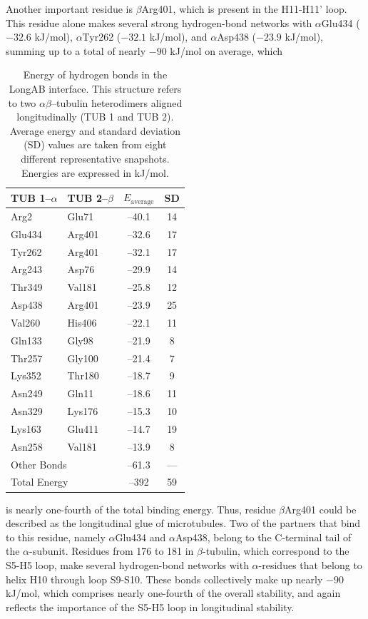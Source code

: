 \documentclass[11pt]{report}
\begin{document}
Another important residue is $\beta$Arg401, which is present in
the H11-H11' loop. This residue alone makes several strong hydrogen-bond networks with $\alpha$Glu434 ($-32.6$ kJ/mol), $\alpha$Tyr262 ($-32.1$ kJ/mol), and $\alpha$Asp438 ($-23.9$ kJ/mol), summing up to a total of nearly $-90$ kJ/mol on average, which
\begin{table}
  \caption[Energy of hydrogen bonds in the LongAB interface]{Energy of hydrogen bonds in the LongAB interface. 
  This structure refers to two $\alpha\beta$--tubulin 
  heterodimers aligned longitudinally (TUB 1 and TUB 2). 
  Average energy and standard deviation (SD) values are taken from eight
  different representative snapshots.
  Energies are expressed in kJ/mol.}
  \label{t:THB-LongAB}
  \centering
  \begin{tabular*}{\linewidth}{@{\extracolsep{\fill}}llcc}
    \toprule
    TUB 1--$\alpha$&	TUB 2--$\beta$	&	$E_{\text{average}}$	&	SD	\\
    \midrule
    Arg2	&	  Glu71		&	--40.1	&	14	\\
    Glu434	&	  Arg401	&	--32.6	&	17	\\
    Tyr262	&	  Arg401	&	--32.1	&	17	\\
    Arg243	&	  Asp76	        &	--29.9	&	14	\\
    Thr349	&	  Val181	&	--25.8	&	12	\\
    Asp438	&	  Arg401	&	--23.9	&	25	\\
    Val260	&	  His406	&	--22.1	&	11	\\
    Gln133	&	  Gly98	        &	--21.9	&	8	\\
    Thr257	&	  Gly100	&	--21.4	&	7	\\
    Lys352	&	  Thr180	&	--18.7	&	9	\\
    Asn249	&	  Gln11	 	&	--18.6	&	11	\\
    Asn329	&	  Lys176	&	--15.3	&	10	\\
    Lys163	&	  Glu411	&	--14.7	&	19	\\
    Asn258	&	  Val181	&	--13.9	&	8	\\
    \multicolumn{2}{l}{Other Bonds}&--61.3&---\\
    \multicolumn{2}{l}{Total Energy}&--392&59\\
    \bottomrule
  \end{tabular*} 
\end{table}
is nearly one-fourth of the total binding energy. Thus, residue $\beta$Arg401 could be described as the longitudinal glue of microtubules. Two of the partners that bind to this residue, namely $\alpha$Glu434 and $\alpha$Asp438, belong to the C-terminal tail of the $\alpha$-subunit. Residues from 176 to 181 in $\beta$-tubulin, which correspond to the S5-H5 loop, make several hydrogen-bond networks with $\alpha$-residues that belong to helix H10 through loop S9-S10. These bonds collectively make up nearly $-90$ kJ/mol, which comprises nearly one-fourth of the overall stability, and again reflects the importance of the S5-H5 loop in longitudinal stability.
\end{document}
